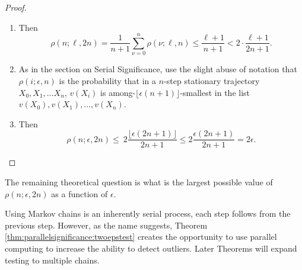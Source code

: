 \documentclass[12pt]{article}
\begin{document}
\begin{proof}
\begin{enumerate}
            \ref{enum:parallelsignifcance:step2},
            \[
                (n+1) \rho(n; \ell, 2n) \le \sum_{\nu=0}^n \rho(\nu;
                \ell, n).
            \] Further
            \begin{equation}
                \label{eq:parallelsignificance:eqn1} \sum_{\nu=0}^n \rho
                (\nu; \ell, n) \le \ell + 1.
            \end{equation}
            (The proof of the next theorem also uses this inequality.)
        \item
            Then
            \[
                \rho(n; \ell, 2n) = \frac{1}{n+1} \sum_{\nu=0}^n \rho(\nu;
                \ell, n) \le \frac{\ell + 1}{n+1} < 2 \cdot \frac{\ell+1}
                {2n+1}.
            \]
        \item
            As in the section on Serial Significance, use the slight
            abuse of notation that \( \rho(i; \epsilon, n) \) is the
            probability that in a \( n \)-step stationary trajectory \(
            X_0, X_1, \dots X_n \), \( v(X_i) \) is among-\( \lfloor
            \epsilon(n+1) \rfloor \)-smallest in the list \( v(X_0), v(X_1),
            \dots, v(X_n) \).
        \item
            Then
            \[
                \rho(n; \epsilon, 2n) \le \ 2 \frac{ \lfloor \epsilon (2n+1)
                \rfloor}{2n+1} \le 2 \frac{ \epsilon (2n+1)}{2n+1} = 2\epsilon.
            \]
    \end{enumerate}
\end{proof}

\begin{remark}
    The remaining theoretical question is what is the largest possible
    value of \( \rho(n; \epsilon, 2n) \) as a function of \( \epsilon \).
\end{remark}

\begin{remark}
    Using Markov chains is an inherently serial process, each step
    follows from the previous step.  However, as the name suggests,
    Theorem~%
    \ref{thm:parallelsignificance:twoepstest} creates the opportunity to
    use parallel computing to increase the ability to detect outliers.
    Later Theorems will expand testing to multiple chains.
\end{remark}
\end{document}
